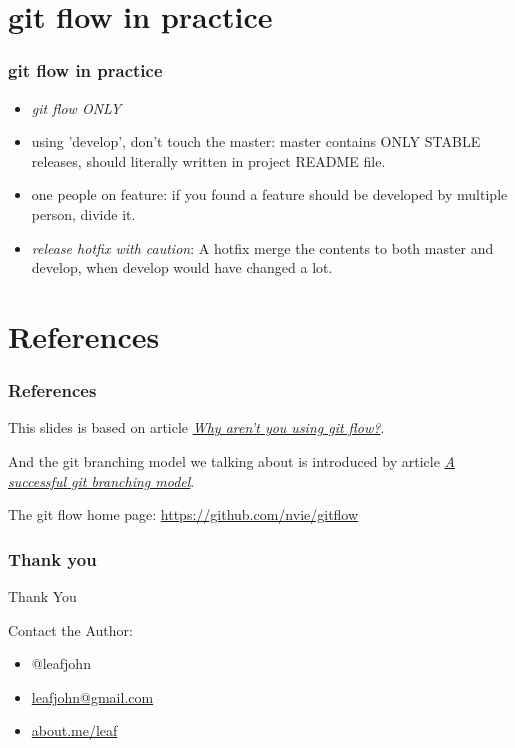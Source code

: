 \documentclass[compress, 11pt, serif]{beamer}
\begin{document}
\section{git flow in practice}
\begin{frame}
\frametitle{git flow in practice}
\begin{itemize}
	\item {\em git flow ONLY}
	\item {using 'develop', don't touch the master}: master contains ONLY STABLE releases, should literally written in project README file.
	\item {one people on feature}: if you found a feature should be developed by multiple person, divide it.
	\item {\em release hotfix with caution}: A hotfix merge the contents to both master and develop, when develop would have changed a lot.
\end{itemize}
\end{frame}

\section{References}
\begin{frame}
	\frametitle{References}

	This slides is based on article \href{http://jeffkreeftmeijer.com/2010/why-arent-you-using-git-flow/}{\textit{ Why aren't you using git flow?}}.


	And the git branching model we talking about is introduced by article \href{http://nvie.com/posts/a-successful-git-branching-model/}{\textit{ A successful git branching model}}.


	The git flow home page: \href{https://github.com/nvie/gitflow}{https://github.com/nvie/gitflow}
\end{frame}
\begin{frame}
	\frametitle{Thank you}
	\begin{center}
	{\huge Thank You}
	\end{center}

	Contact the Author:
	\begin{itemize}
		\item @leafjohn
		\item \href{mailto:leafjohn@gmail.com}{leafjohn@gmail.com} 
		\item \href{http://about.me/leaf}{about.me/leaf}
	\end{itemize}
\end{frame}
\end{document}
